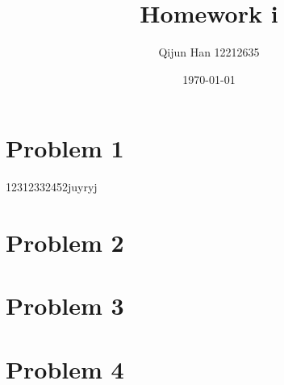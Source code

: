 \documentclass[12pt,a4paper]{article}
\title{Homework i}
\author{Qijun Han 12212635}
\date{\today}
\begin{document}
\maketitle

\section{Problem 1}
12312332452juyryj
\section{Problem 2}

\section{Problem 3}

\section{Problem 4}
\end{document}
